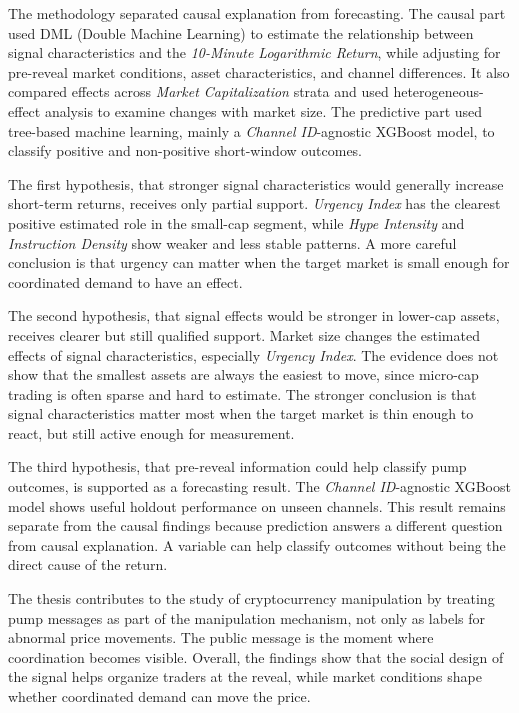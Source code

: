 The methodology separated causal explanation from forecasting. The causal part used DML (Double Machine Learning) to estimate the relationship between signal characteristics and the \textit{10-Minute Logarithmic Return}, while adjusting for pre-reveal market conditions, asset characteristics, and channel differences. It also compared effects across \textit{Market Capitalization} strata and used heterogeneous-effect analysis to examine changes with market size. The predictive part used tree-based machine learning, mainly a \textit{Channel ID}-agnostic XGBoost model, to classify positive and non-positive short-window outcomes.

The first hypothesis, that stronger signal characteristics would generally increase short-term returns, receives only partial support. \textit{Urgency Index} has the clearest positive estimated role in the small-cap segment, while \textit{Hype Intensity} and \textit{Instruction Density} show weaker and less stable patterns. A more careful conclusion is that urgency can matter when the target market is small enough for coordinated demand to have an effect.

The second hypothesis, that signal effects would be stronger in lower-cap assets, receives clearer but still qualified support. Market size changes the estimated effects of signal characteristics, especially \textit{Urgency Index}. The evidence does not show that the smallest assets are always the easiest to move, since micro-cap trading is often sparse and hard to estimate. The stronger conclusion is that signal characteristics matter most when the target market is thin enough to react, but still active enough for measurement.

The third hypothesis, that pre-reveal information could help classify pump outcomes, is supported as a forecasting result. The \textit{Channel ID}-agnostic XGBoost model shows useful holdout performance on unseen channels. This result remains separate from the causal findings because prediction answers a different question from causal explanation. A variable can help classify outcomes without being the direct cause of the return.

The thesis contributes to the study of cryptocurrency manipulation by treating pump messages as part of the manipulation mechanism, not only as labels for abnormal price movements. The public message is the moment where coordination becomes visible. Overall, the findings show that the social design of the signal helps organize traders at the reveal, while market conditions shape whether coordinated demand can move the price.

